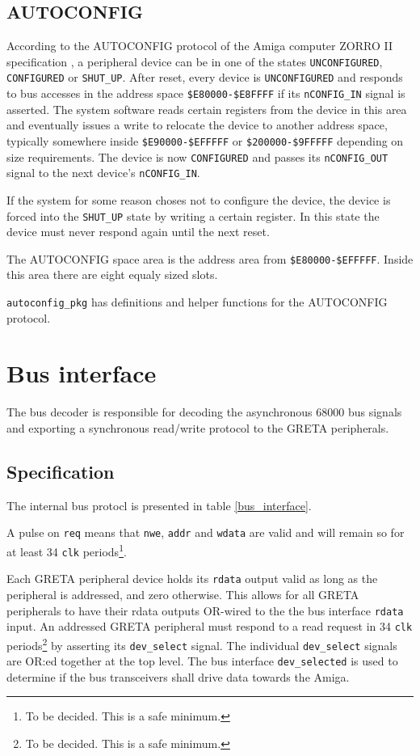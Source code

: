 \documentclass[a4paper]{report}
\begin{document}
\section{AUTOCONFIG}
According to the AUTOCONFIG protocol of the Amiga computer
ZORRO II specification \cite{a500_techref}, a peripheral
device can be in one of the states \texttt{UNCONFIGURED},
\texttt{CONFIGURED} or \texttt{SHUT\_UP}. After reset,
every device is \texttt{UNCONFIGURED} and responds to bus
accesses in the address space \texttt{\$E80000-\$E8FFFF}
if its \texttt{nCONFIG\_IN} signal is asserted. The system
software reads certain registers from the device in this
area and eventually issues a write to relocate the device
to another address space, typically somewhere inside
\texttt{\$E90000-\$EFFFFF} or \texttt{\$200000-\$9FFFFF}
depending on size requirements. The device is now
\texttt{CONFIGURED} and passes its \texttt{nCONFIG\_OUT}
signal to the next device's \texttt{nCONFIG\_IN}.

If the system for some reason choses not to configure the
device, the device is forced into the \texttt{SHUT\_UP} state
by writing a certain register. In this state the device must
never respond again until the next reset.

The AUTOCONFIG space area is the address area from
\texttt{\$E80000-\$EFFFFF}. Inside this area there are eight
equaly sized slots.

\texttt{autoconfig\_pkg}
has definitions and helper functions for the AUTOCONFIG protocol.

\chapter{Bus interface}
The bus decoder is responsible for decoding the asynchronous
68000 bus signals and exporting a synchronous read/write
protocol to the GRETA peripherals.

\section{Specification}
The internal bus protocl is presented in table
\ref{bus_interface}.

A pulse on \texttt{req} means that \texttt{nwe}, \texttt{addr}
and \texttt{wdata} are valid and will remain so for at least
34 \texttt{clk} periods\footnote{To be decided. This is a
safe minimum.}.

Each GRETA peripheral device holds its \texttt{rdata}
output valid as long as the peripheral is addressed, and zero
otherwise. This allows for all GRETA peripherals to have their
rdata outputs OR-wired to the the bus interface \texttt{rdata}
input. An addressed GRETA peripheral must respond to a read
request in 34 \texttt{clk} periods\footnote{To be decided. This
is a safe minimum.} by asserting its \texttt{dev\_select}
signal. The individual \texttt{dev\_select} signals
are OR:ed together at the top level. The bus interface
\texttt{dev\_selected} is used to determine if the bus
transceivers shall drive data towards the Amiga.
\end{document}
